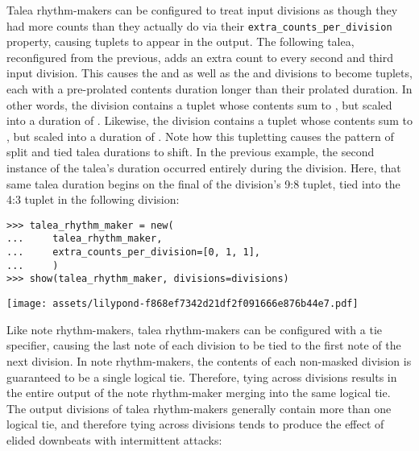 \noindent Talea rhythm-makers can be configured to treat input divisions as
though they had more counts than they actually do via their
\texttt{extra\_counts\_per\_division} property, causing tuplets to appear in
the output. The following talea, reconfigured from the previous, adds an extra
count to every second and third input division. This causes the 
and  as well as the  and  divisions to
become tuplets, each with a pre-prolated contents duration  longer
than their prolated duration. In other words, the  division
contains a tuplet whose contents sum to , but scaled into a
duration of . Likewise, the  division contains a
tuplet whose contents sum to , but scaled into a duration of
. Note how this tupletting causes the pattern of split and tied
talea durations to shift. In the previous example, the second instance of the
talea's  duration occurred entirely during the 
division. Here, that same  talea duration begins on the final
 of the  division's 9:8 tuplet, tied into the 4:3
tuplet in the following division:

\begin{comment}
<abjad>
talea_rhythm_maker = new(
    talea_rhythm_maker,
    extra_counts_per_division=[0, 1, 1],
    )
show(talea_rhythm_maker, divisions=divisions)
</abjad>
\end{comment}

\begin{abjadbookoutput}
\begin{singlespacing}
\vspace{-0.5\baselineskip}
\begin{verbatim}
>>> talea_rhythm_maker = new(
...     talea_rhythm_maker,
...     extra_counts_per_division=[0, 1, 1],
...     )
>>> show(talea_rhythm_maker, divisions=divisions)
\end{verbatim}
\noindent\texttt{[image: assets/lilypond-f868ef7342d21df2f091666e876b44e7.pdf]}
\end{singlespacing}
\end{abjadbookoutput}

\noindent Like note rhythm-makers, talea rhythm-makers can be configured with a
tie specifier, causing the last note of each division to be tied to the first
note of the next division. In note rhythm-makers, the contents of each
non-masked division is guaranteed to be a single logical tie. Therefore, tying
across divisions results in the entire output of the note rhythm-maker merging
into the same logical tie. The output divisions of talea rhythm-makers
generally contain more than one logical tie, and therefore tying across
divisions tends to produce the effect of elided downbeats with intermittent
attacks:

